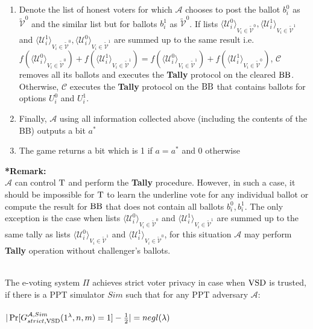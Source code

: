 \begin{enumerate}
\item Denote the list of honest voters for which $\mathcal{A}$ chooses to post the ballot  $b_i^0$  as $ \tilde{\mathcal{V}}^0$ and the similar list but for ballots $b_i^1$ as $ \tilde{\mathcal{V}}^0$.  If  lists $\langle \mathcal{U}^0_i \rangle _{V_i \in \tilde{\mathcal{V}}^0}, \langle \mathcal{U}^1_i \rangle _{V_i \in \tilde{\mathcal{V}}^1}$ and $\langle \mathcal{U}^1_i \rangle _{V_i \in \tilde{\mathcal{V}}^0}, \langle \mathcal{U}^0_i \rangle _{V_i \in \tilde{\mathcal{V}}^1}$ are summed up to the same result i.e. $f(\langle \mathcal{U}^0_i \rangle _{V_i \in \tilde{\mathcal{V}}^0} ) + f(\langle \mathcal{U}^1_i \rangle _{V_i \in \tilde{\mathcal{V}}^1} ) =  f(\langle \mathcal{U}^0_i \rangle _{V_i \in \tilde{\mathcal{V}}^1} ) +  f(\langle \mathcal{U}^1_i \rangle _{V_i \in \tilde{\mathcal{V}}^0} )$, $\mathcal{C}$ removes all its ballots and executes the \textbf{Tally} protocol on the cleared $\operatorname{BB}$. Otherwise, $\mathcal{C}$ executes the \textbf{Tally} protocol on the $\operatorname{BB}$ that contains ballots for options $U_i^0$ and $U_i^1$. 
\item Finally, $\mathcal{A}$ using all information collected above (including the contents of the BB) outputs a bit $a^*$
\item The game returns a bit which is 1 if $a = a^*$ and 0 otherwise
\end{enumerate}
\textbf{*Remark:}\\
$\mathcal{A}$ can control $\operatorname{T}$ and perform the \textbf{Tally} procedure. However, in such a case, it should be impossible for $\operatorname{T}$ to learn the underline vote for any individual ballot or compute the result for $\operatorname{BB}$ that does not contain all ballots $b_i^0,b_i^1$. The only exception is the case when lists  $\langle \mathcal{U}^0_i \rangle _{V_i \in \tilde{\mathcal{V}}^0} $ and  $\langle \mathcal{U}^1_i \rangle _{V_i \in \tilde{\mathcal{V}}^1} $  are summed up to the same tally as lists  $\langle \mathcal{U}^0_i \rangle _{V_i \in \tilde{\mathcal{V}}^1} $ and  $\langle \mathcal{U}^1_i \rangle _{V_i \in \tilde{\mathcal{V}}^0} $, for this situation $\mathcal{A}$ may perform \textbf{Tally} operation without challenger's ballots. \\\\
\begin{definition}
The e-voting system $\Pi$ achieves strict voter privacy in case when $\operatorname{VSD}$ is trusted, if there is a PPT simulator $Sim$ such that for any PPT adversary $\mathcal{A}$:\\\\
 $|\Pr[G_{strict,\operatorname{VSD}}^{\mathcal{A},Sim}(1^{\lambda},n,m) = 1] - \frac{1}{2}| = negl(\lambda)$
 \end{definition}
